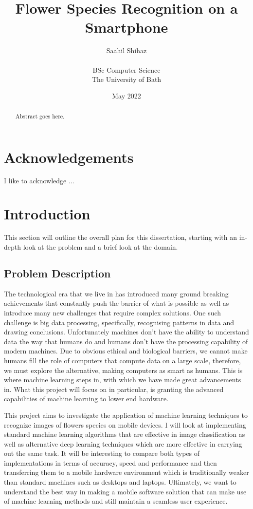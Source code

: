 \documentclass{article}
\title{Flower Species Recognition on a Smartphone}
\author{Saahil Shihaz\\\\BSc Computer Science\\The University of Bath}
\date{May 2022}
\begin{document}
\maketitle
\clearpage
\begin{abstract}

Abstract goes here.

\end{abstract}
\clearpage
\tableofcontents
\clearpage
\listoffigures
\clearpage
\section*{Acknowledgements}
\thispagestyle{empty}

I like to acknowledge ...

\clearpage
{}
\section{Introduction}

This section will outline the overall plan for this dissertation, starting with an in-depth look at the problem and a 
brief look at the domain.

\subsection{Problem Description}

The technological era that we live in has introduced many ground breaking achievements that constantly push the barrier 
of what is possible as well as introduce many new challenges that require complex solutions. One such challenge is big 
data processing, specifically, recognising patterns in data and drawing conclusions. Unfortunately machines don't have 
the ability to understand data the way that humans do and humans don't have the processing capability of modern 
machines. Due to obvious ethical and biological barriers, we cannot make humans fill the role of computers that compute 
data on a large scale, therefore, we must explore the alternative, making computers as smart as humans. This is where 
machine learning steps in, with which we have made great advancements in. What this project will focus on in particular,
is granting the advanced capabilities of machine learning to lower end hardware.

\par

This project aims to investigate the application of machine learning techniques to recognize images of flowers species 
on mobile devices. I will look at implementing standard machine learning algorithms that are effective in image 
classification as well as alternative deep learning techniques which are more effective in carrying out the same task. 
It will be interesting to compare both types of implementations in terms of accuracy, speed and performance and then 
transferring them to a mobile hardware environment which is traditionally weaker than standard machines such as desktops
and laptops. Ultimately, we want to understand the best way in making a mobile software solution that can make use of 
machine learning methods and still maintain a seamless user experience.
\end{document}
